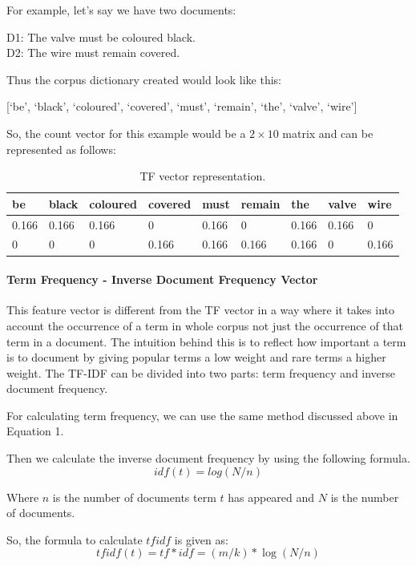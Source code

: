 For example, let's say we have two documents:
\begin{center}
	D1: The valve must be coloured black.\\
	D2: The wire must remain covered.
\end{center}
Thus the corpus dictionary created would look like this:
\begin{center}
	[`be', `black', `coloured', `covered', `must', `remain', `the', `valve', `wire']
\end{center}
So, the count vector for this example would be a $2\times 10$ matrix and can be represented as follows:
\begin{table}
	\centering
	\caption{TF vector representation.}\label{tab2}
	\begin{tabular}{|l|l|l|l|l|l|l|l|l|}
		\hline
		be & black & coloured & covered & must & remain & the & valve & wire\\
		\hline
		0.166 & 0.166 & 0.166 & 0 & 0.166 & 0 & 0.166 & 0.166 & 0\\
		0 & 0 & 0 & 0.166 & 0.166 & 0.166 & 0.166 & 0 & 0.166\\
		\hline
	\end{tabular}
\end{table}


\paragraph{Term Frequency - Inverse Document Frequency Vector}\label{sec:tfidf}
This feature vector is different from the TF vector in a way where it takes into account the occurrence of a term in whole corpus not just the occurrence of that term in a document. The intuition behind this is to reflect how important a term is to document by giving popular terms a low weight and rare terms a higher weight. The TF-IDF can be divided into two parts: term frequency and inverse document frequency. 

For calculating term frequency, we can use the same method discussed above in Equation 1.

Then we calculate the inverse document frequency by using the following formula.
\begin{equation}
idf(t) = log(N/n)
\end{equation}

Where $n$ is the number of documents term $t$ has appeared and $N$ is the number of documents.

So, the formula to calculate $tfidf$ is given as:
\begin{equation}
tfidf(t) = tf*idf = (m/k)*\log(N/n)
\end{equation}

